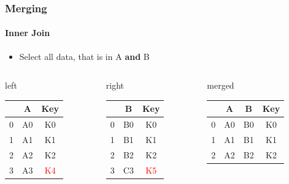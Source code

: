 \documentclass[ngerman]{beamer}
\def\firstcircle{(0,0) circle (2cm)}
\def\secondcircle{(0:3cm) circle (2cm)}
\begin{document}
\begin{frame}
\frametitle{Merging}
\framesubtitle{Inner Join}

\begin{itemize}
\item Select all data, that is in A \textbf{and} B
\end{itemize}

\begin{center}
\end{center}

{\footnotesize
\begin{columns}
\begin{column}{0.3\textwidth}
left \\
\begin{tabular}{c|cc} \toprule
   & A  &  Key \\ \midrule
0 & A0 &  K0 \\
1 & A1 &  K1 \\ 
2 & A2 &  K2 \\
3 & A3 &  \textcolor{red}{K4} \\ \bottomrule
\end{tabular}
\end{column}
\begin{column}{0.3\textwidth}
right \\
\begin{tabular}{c|cc} \toprule
   &  B   & Key \\ \midrule
0 &  B0 & K0 \\
1 &  B1 & K1 \\ 
2 &  B2 & K2 \\
3 &  C3 & \textcolor{red}{K5} \\ \bottomrule
\end{tabular}\end{column}
\begin{column}{0.3\textwidth}
merged \\
\begin{tabular}{c|ccc} \toprule
   & A  & B   & Key \\ \midrule
0 & A0 & B0 & K0 \\
1 & A1 & B1 & K1 \\ 
2 & A2 & B2 & K2 \\ \bottomrule
\end{tabular} \\
\vspace*{1.5em}
\end{column}
\end{columns}}


\end{frame}
\end{document}
